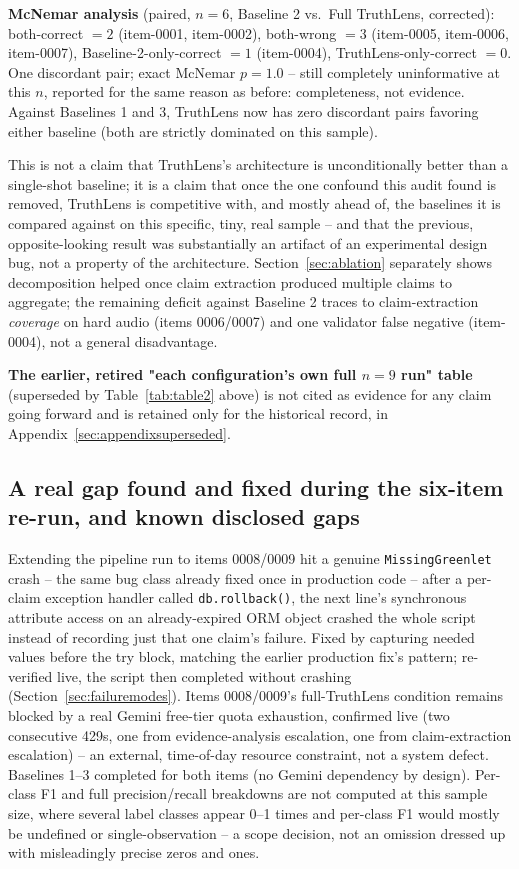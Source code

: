 \documentclass[conference]{IEEEtran}
\begin{document}
\textbf{McNemar analysis} (paired, $n=6$, Baseline 2 vs.\ Full TruthLens,
corrected): both-correct $=2$ (item-0001, item-0002), both-wrong $=3$
(item-0005, item-0006, item-0007), Baseline-2-only-correct $=1$
(item-0004), TruthLens-only-correct $=0$. One discordant pair; exact
McNemar $p=1.0$ -- still completely uninformative at this $n$, reported
for the same reason as before: completeness, not evidence. Against
Baselines 1 and 3, TruthLens now has zero discordant pairs favoring
either baseline (both are strictly dominated on this sample).

This is not a claim that TruthLens's architecture is unconditionally
better than a single-shot baseline; it is a claim that once the one
confound this audit found is removed, TruthLens is competitive with, and
mostly ahead of, the baselines it is compared against on this specific,
tiny, real sample -- and that the previous, opposite-looking result was
substantially an artifact of an experimental design bug, not a property
of the architecture. Section~\ref{sec:ablation} separately shows
decomposition helped once claim extraction produced multiple claims to
aggregate; the remaining deficit against Baseline 2 traces to
claim-extraction \emph{coverage} on hard audio (items 0006/0007) and one
validator false negative (item-0004), not a general disadvantage.

\textbf{The earlier, retired "each configuration's own full $n=9$ run"
table} (superseded by Table~\ref{tab:table2} above) is not cited as
evidence for any claim going forward and is retained only for the
historical record, in Appendix~\ref{sec:appendixsuperseded}.

\subsection{A real gap found and fixed during the six-item re-run, and known
disclosed gaps}
Extending the pipeline run to items 0008/0009 hit a genuine
\texttt{MissingGreenlet} crash -- the same bug class already fixed once in
production code -- after a per-claim exception handler called
\texttt{db.rollback()}, the next line's synchronous attribute access on an
already-expired ORM object crashed the whole script instead of recording
just that one claim's failure. Fixed by capturing needed values before the
try block, matching the earlier production fix's pattern; re-verified
live, the script then completed without crashing
(Section~\ref{sec:failuremodes}). Items 0008/0009's full-TruthLens
condition remains blocked by a real Gemini free-tier quota exhaustion,
confirmed live (two consecutive 429s, one from evidence-analysis
escalation, one from claim-extraction escalation) -- an external,
time-of-day resource constraint, not a system defect. Baselines 1--3
completed for both items (no Gemini dependency by design). Per-class F1
and full precision/recall breakdowns are not computed at this sample
size, where several label classes appear 0--1 times and per-class F1
would mostly be undefined or single-observation -- a scope decision, not
an omission dressed up with misleadingly precise zeros and ones.
\end{document}

